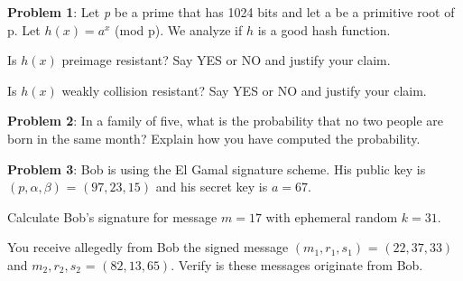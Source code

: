 \documentclass[12pt,letterpaper,final]{report}
\begin{document}

\vline


\bigskip
\noindent\textbf{Problem 1}: Let \textit{p} be a prime that has 1024 bits and let a be a primitive root of p.
\newline Let $h(x) = a^{x}$ (mod p). We analyze if $h$ is a good hash function.
\begin{alphalist}
	\item\indent Is $h(x)$ preimage resistant? Say YES or NO and justify your claim.
	\item\indent Is $h(x)$ weakly collision resistant? Say YES or NO and justify your claim.
\end{alphalist}

\bigskip

\noindent\textbf{Problem 2}: In a family of five, what is the probability that no two people are born in the same month? Explain how you have computed the probability. 
\bigskip

\noindent\textbf{Problem 3}: Bob is using the El Gamal signature scheme. His public key is $(p, \alpha, \beta)$ = $(97, 23, 15)$ and his secret key is $a = 67$.
\begin{alphlist}
	\item\indent Calculate Bob's signature for message $m = 17$ with ephemeral random $k = 31$.
	\item\indent You receive allegedly from Bob the signed message $(m_{1}, r_{1}, s_{1})$ = $(22, 37, 33)$ and $m_{2}, r_{2}, s_{2}$ = $(82, 13, 65)$. Verify is these messages originate from Bob.
\end{alphlist}
\end{document}
